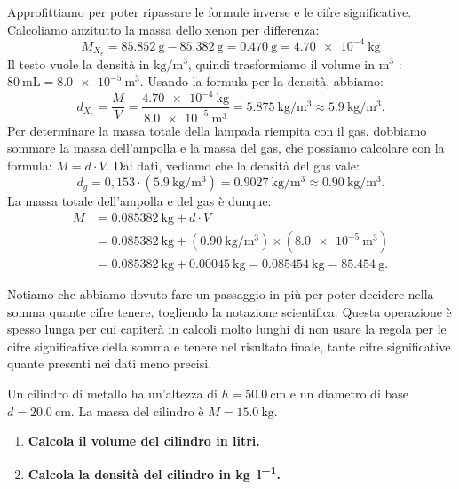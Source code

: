 Approfittiamo per poter ripassare le formule inverse e le cifre significative. Calcoliamo anzitutto la massa dello xenon per differenza:
\[
M_{X_e} = \SI{85,852}{\gram} -\SI{85,382}{\gram}  = \SI{0,470}{\gram} =\SI{4,70e-4}{\kilo\gram}
\]
Il testo vuole la densità in $\si{\kilo\gram\per\cubic\meter}$, quindi trasformiamo il volume in $\si{\cubic\meter}$ :  $\SI{80}{\milli\liter} =\SI{8,0e-5}{\cubic\meter}$.
Usando la formula per la densità, abbiamo:
\[
d_{X_e}=\frac{M}{V} = \frac{\SI{4,70e-4}{\kilo\gram}}{\SI{8,0e-5}{\cubic\meter}}=\SI{5,875}{\kilo\gram\per\cubic\meter}      \approx  \SI{5,9}{\kilo\gram\per\cubic\meter}.  
\]
Per determinare la massa totale della lampada riempita con il gas, dobbiamo sommare la massa dell'ampolla e la massa del gas, che possiamo calcolare con la formula: $M=d\cdot V$.
Dai dati, vediamo che la densità del gas vale:
\[
d_{g} = 0,153 \cdot\left( \SI{5,9}{\kilo\gram\per\cubic\meter}\right) = \SI{0,9027}{\kilo\gram\per\cubic\meter } \approx \SI{0,90}{\kilo\gram\per\cubic\meter }.
\]
La massa totale dell'ampolla e del gas è dunque:
\[
\begin{aligned}
    M &= \SI{0,085382}{\kilo\gram} + d \cdot V \\
      &= \SI{0,085382}{\kilo\gram} + \left(\SI{0,90}{\kilo\gram\per\cubic\meter}\right) \times \left(\SI{8,0e-5}{\cubic\meter}\right) \\
      &= \SI{0,085382}{\kilo\gram}  + \SI{0,00045}{\kilo\gram} = \SI{0,085454}{\kilo\gram} = \SI{85,454}{\gram}.
\end{aligned}
\]

Notiamo che abbiamo dovuto fare un passaggio in più per poter decidere nella somma quante cifre tenere, togliendo la notazione scientifica. Questa operazione è spesso lunga per cui capiterà in calcoli molto lunghi di non usare la regola per le cifre significative della somma e tenere nel risultato finale, tante cifre significative quante presenti nei dati meno precisi.


\begin{testexample}
Un cilindro di metallo ha un'altezza di \(h = \SI{50,0}{\centi\metre}\) e un diametro di base \(d = \SI{20,0}{\centi\metre}\). La massa del cilindro è \(M = \SI{15,0}{\kilogram}\).

\begin{enumerate}
    \item \textbf{Calcola il volume del cilindro in litri.}
    \item \textbf{Calcola la densità del cilindro in \si{\kilogram\per\litre}.}
\end{enumerate}
\end{testexample}

